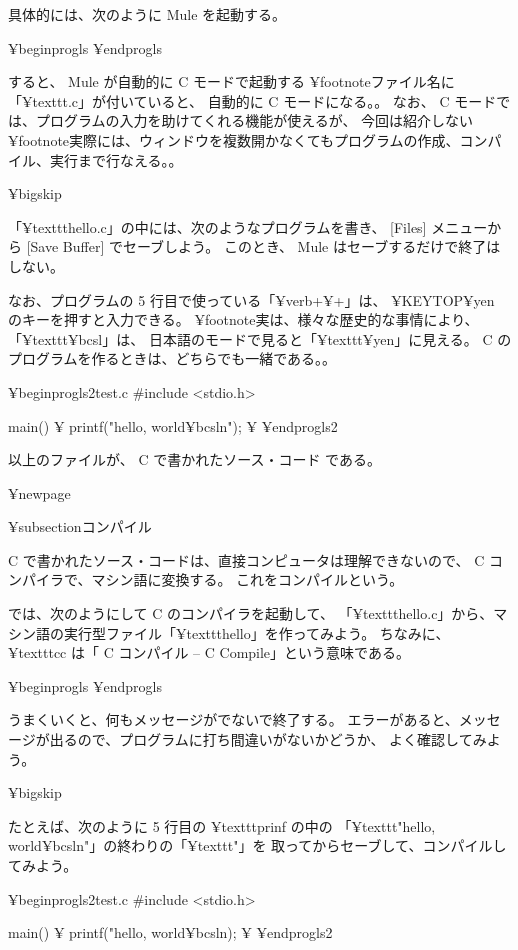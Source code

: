 具体的には、次のように Mule を起動する。

¥begin{progls}
¥end{progls}

すると、 Mule が自動的に C モードで起動する
¥footnote{ファイル名に「¥texttt{.c}」が付いていると、
自動的に C モードになる。}。
なお、 C モードでは、プログラムの入力を助けてくれる機能が使えるが、
今回は紹介しない¥footnote{実際には、ウィンドウを複数開かなくてもプログラムの作成、コンパイル、実行まで行なえる。}。

¥bigskip

「¥texttt{hello.c}」の中には、次のようなプログラムを書き、
 [Files] メニューから [Save Buffer] でセーブしよう。
このとき、 Mule はセーブするだけで終了はしない。

なお、プログラムの 5 行目で使っている「¥verb+¥+」は、
 ¥KEYTOP{¥yen} のキーを押すと入力できる。
¥footnote{実は、様々な歴史的な事情により、「¥texttt{¥bcsl}」は、
日本語のモードで見ると「¥texttt{¥yen}」に見える。
 C のプログラムを作るときは、どちらでも一緒である。}。

¥begin{progls2}{test.c}
#include <stdio.h>

main()
¥{
  printf("hello, world{¥bcsl}n");
¥}
¥end{progls2}

以上のファイルが、 C で書かれたソース・コード
である。

¥newpage

¥subsection{コンパイル}

 C で書かれたソース・コードは、直接コンピュータは理解できないので、
 C コンパイラで、マシン語に変換する。
これをコンパイルという。

では、次のようにして C のコンパイラを起動して、
「¥texttt{hello.c}」から、マシン語の実行型ファイル「¥texttt{hello}」を作ってみよう。
ちなみに、 ¥texttt{cc} は「 C コンパイル -- C Compile」という意味である。

¥begin{progls}
%
¥end{progls}

うまくいくと、何もメッセージがでないで終了する。
エラーがあると、メッセージが出るので、プログラムに打ち間違いがないかどうか、
よく確認してみよう。

¥bigskip

たとえば、次のように 5 行目の ¥texttt{prinf} の中の
「¥texttt{"hello, world{¥bcsl}n"}」の終わりの「¥texttt{"}」を
取ってからセーブして、コンパイルしてみよう。

¥begin{progls2}{test.c}
#include <stdio.h>

main()
¥{
  printf("hello, world{¥bcsl}n);
¥}
¥end{progls2}

